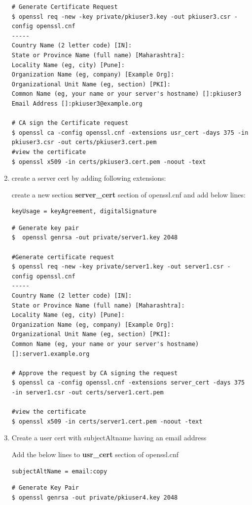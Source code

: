 \documentclass[12pt]{report}
\begin{document}
\begin{enumerate}[label*=\arabic*.]
\begin{lstlisting}[style=bashInputStyle]
# Generate Certificate Request
$ openssl req -new -key private/pkiuser3.key -out pkiuser3.csr -config openssl.cnf
-----
Country Name (2 letter code) [IN]:
State or Province Name (full name) [Maharashtra]:
Locality Name (eg, city) [Pune]:
Organization Name (eg, company) [Example Org]:
Organizational Unit Name (eg, section) [PKI]:
Common Name (eg, your name or your server's hostname) []:pkiuser3
Email Address []:pkiuser3@example.org

# CA sign the Certificate request 
$ openssl ca -config openssl.cnf -extensions usr_cert -days 375 -in pkiuser3.csr -out certs/pkiuser3.cert.pem
#view the certificate
$ openssl x509 -in certs/pkiuser3.cert.pem -noout -text
        \end{lstlisting}

    \item create a server cert by adding following extensions:

        create a new section \textbf{server\_cert} section of openssl.cnf and add below lines:
        \begin{lstlisting}
keyUsage = keyAgreement, digitalSignature
        \end{lstlisting}
        \begin{lstlisting}[style=bashInputStyle]
# Generate key pair
$  openssl genrsa -out private/server1.key 2048        

#Generate certificate request
$ openssl req -new -key private/server1.key -out server1.csr -config openssl.cnf
-----
Country Name (2 letter code) [IN]:
State or Province Name (full name) [Maharashtra]:
Locality Name (eg, city) [Pune]:
Organization Name (eg, company) [Example Org]:
Organizational Unit Name (eg, section) [PKI]:
Common Name (eg, your name or your server's hostname) []:server1.example.org

# Approve the request by CA signing the request
$ openssl ca -config openssl.cnf -extensions server_cert -days 375 -in server1.csr -out certs/server1.cert.pem

#view the certificate
$ openssl x509 -in certs/server1.cert.pem -noout -text
        \end{lstlisting}
    
    \item Create a user cert with subjectAltname having an email address

        Add the below lines to \textbf{usr\_cert} section of openssl.cnf
        \begin{lstlisting}
subjectAltName = email:copy
        \end{lstlisting}
        \begin{lstlisting}[style=bashInputStyle]
# Generate Key Pair
$ openssl genrsa -out private/pkiuser4.key 2048        


\end{lstlisting}
\end{enumerate}
\end{document}
